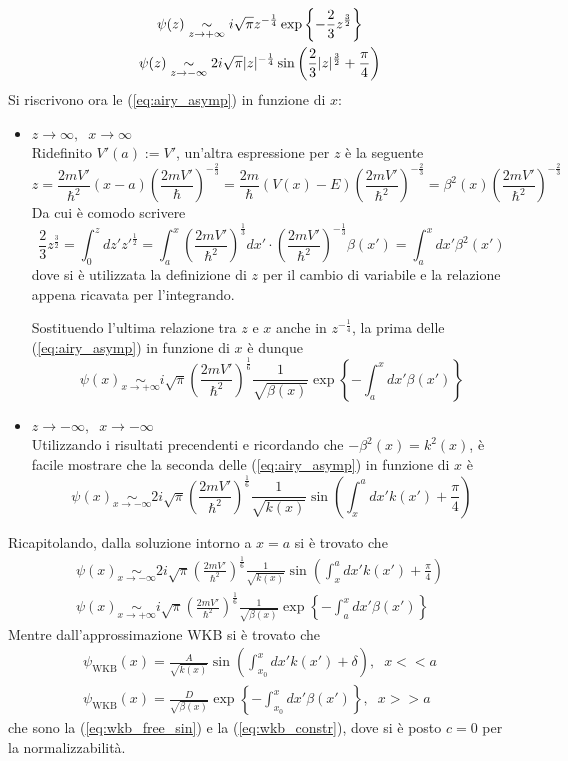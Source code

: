 \begin{gather}
    \psi(z)\underset{z\to+\infty}\sim
    i\sqrt{\pi}z^{-\frac{1}{4}}\exp\left\{-\frac{2}{3}z^{\frac{3}{2}}\right\}\notag\\
    \psi(z)\underset{z\to-\infty}\sim
    2i\sqrt{\pi}|z|^{-\frac{1}{4}}\sin\left(\frac{2}{3}|z|^{\frac{3}{2}}
    +\frac{\pi}{4}\right)	
    \label{eq:airy_asymp}
\end{gather}
Si riscrivono ora le (\ref{eq:airy_asymp}) in funzione di $x$:
\begin{itemize}[leftmargin=*]
    \item $z\to\infty,\phantom{x}x\to\infty$\\
Ridefinito $V'(a):=V'$, un'altra espressione per $z$ è la seguente
$$z = \frac{2mV'}{\hbar^2}(x-a)\left(\frac{2mV'}{\hbar}\right)^{-\frac{2}{3}}=
\frac{2m}{\hbar}(V(x)-E)\left(\frac{2mV'}{\hbar^2}\right)^{-\frac{2}{3}}
=\beta^2(x)\left(\frac{2mV'}{\hbar^2}\right)^{-\frac{2}{3}}$$
Da cui è comodo scrivere
$$\frac{2}{3}z^{\frac{3}{2}} = \int_{0}^{z}dz'z'^{\frac{1}{2}} = 
\int_{a}^{x}\left(\frac{2mV'}{\hbar^2}\right)^{\frac{1}{3}}dx'\cdot
\left(\frac{2mV'}{\hbar^2}\right)^{-\frac{1}{3}}\beta(x') =\int_{a}^{x}dx'\beta^2(x')
$$
dove si è utilizzata la definizione di $z$ per il cambio di variabile e la relazione
appena ricavata per l'integrando.

Sostituendo l'ultima relazione tra $z$ e $x$ anche in $z^{-\frac{1}{4}}$, la prima
delle (\ref{eq:airy_asymp}) in funzione di $x$ è dunque
$$\psi(x)\underset{x\to+\infty}\sim
i\sqrt{\pi}\left(\frac{2mV'}{\hbar^2}\right)^{\frac{1}{6}}\frac{1}{\sqrt{\beta(x)}}
\exp\left\{-\int_{a}^{x}dx'\beta(x')\right\}$$
\item $z\to-\infty,\phantom{x}x\to-\infty$\\
Utilizzando i risultati precendenti e ricordando che $-\beta^2(x)=k^2(x)$, è facile
mostrare che la seconda delle (\ref{eq:airy_asymp}) in funzione di $x$ è
$$\psi(x)\underset{x\to-\infty}\sim
2i\sqrt{\pi}\left(\frac{2mV'}{\hbar^2}\right)^{\frac{1}{6}}\frac{1}{\sqrt{k(x)}}
\sin\left(\int_{x}^{a}dx'k(x') +\frac{\pi}{4}\right)
$$
\end{itemize}
Ricapitolando, dalla soluzione intorno a $x=a$ si è trovato che
\begin{gather*}
\psi(x)\underset{x\to-\infty}\sim
2i\sqrt{\pi}\left(\frac{2mV'}{\hbar^2}\right)^{\frac{1}{6}}\frac{1}{\sqrt{k(x)}}
\sin\left(\int_{x}^{a}dx'k(x') +\frac{\pi}{4}\right)\\
\psi(x)\underset{x\to+\infty}\sim
i\sqrt{\pi}\left(\frac{2mV'}{\hbar^2}\right)^{\frac{1}{6}}\frac{1}{\sqrt{\beta(x)}}
\exp\left\{-\int_{a}^{x}dx'\beta(x')\right\}
\end{gather*}
Mentre dall'approssimazione WKB si è trovato che
\begin{gather*}
    \psi_\text{WKB}(x)=\frac{A}{\sqrt{k(x)}} \sin\left(\int_{x_0}^{x}dx'k(x')+\delta\right),\phantom{x}x<<a\\
    \psi_\text{WKB}(x) = \frac{D}{\sqrt{\beta(x)}}\exp\left\{-\int_{x_0}^{x}dx'\beta(x')\right\},\phantom{x}x>>a
\end{gather*}
che sono la (\ref{eq:wkb_free_sin}) e la (\ref{eq:wkb_constr}), dove si è posto $c=0$
per la normalizzabilità.

